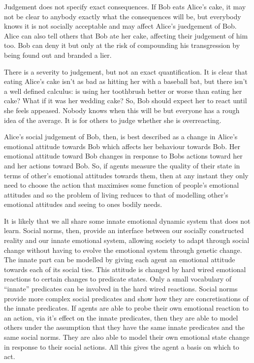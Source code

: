 \documentclass[a4paper]{article}
\begin{document}
Judgement does not specify exact consequences. If Bob eats Alice's cake, it may not be clear to anybody exactly what the consequences will be, but everybody knows it is not socially acceptable and may affect Alice's juedgement of Bob. Alice can also tell others that Bob ate her cake, affecting their judgement of him too. Bob can deny it but only at the risk of compounding his transgression by being found out and branded a lier.

There is a severity to judgement, but not an exact quantification. It is clear that eating Alice's cake isn't as bad as hitting her with a baseball bat, but there isn't a well defined calculus: is using her toothbrush better or worse than eating her cake? What if it was her wedding cake? So, Bob should expect her to react until she feels appeased. Nobody knows when this will be but everyone has a rough idea of the average. It is for others to judge whether she is overreacting.

Alice's social judgement of Bob, then, is best described as a change in Alice's emotional attitude towards Bob which affects her behaviour towards Bob. Her emotional attitude toward Bob changes in response to Bobs actions toward her and her actions toward Bob. So, if agents measure the quality of their state in terms of other's emotional attitudes towards them, then at any instant they only need to choose the action that maximises some function of people's emotional attitudes and so the problem of living reduces to that of modelling other's emotional attitudes and seeing to ones bodily needs.

It is likely that we all share some innate emotional dynamic system that does not learn. Social norms, then, provide an interface between our socially constructed reality and our innate emotional system, allowing society to adapt through social change without having to evolve the emotional system through genetic change. The innate part can be modelled by giving each agent an emotional attitude towards each of its social ties. This attitude is changed by hard wired emotional reactions to certain changes to predicate states. Only a small vocabulary of ``innate'' predicates can be involved in the hard wired reactions. Social norms provide more complex social predicates and show how they are concretisations of the innate predicates. If agents are able to probe their own emotional reaction to an action, via it's effect on the innate predicates, then they are able to model others under the assumption that they have the same innate predicates and the same social norms. They are also able to model their own emotional state change in response to their social actions. All this gives the agent a basis on which to act.
\end{document}
